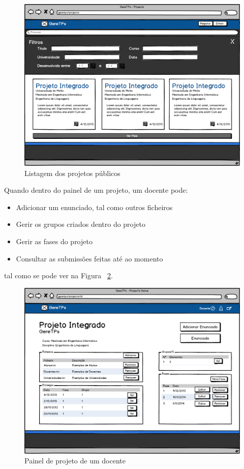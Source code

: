 \begin{figure}[htbp] 
        \centering
        \includegraphics[width=1\textwidth]{images/prototipos/mockups/Projetos.png}
         \caption{Listagem dos projetos públicos}
         \label{fig: projetospublicos}
\end{figure}


Quando dentro do painel de um projeto, um docente pode:

\begin{itemize}
	\item Adicionar um enunciado, tal como outros ficheiros
	\item Gerir os grupos criados dentro do projeto
	\item Gerir as fases do projeto
	\item Consultar as submissões feitas até ao momento
\end{itemize}
tal como se pode ver na Figura ~\ref{fig: painelprojetodocente}.\\

\begin{figure}[htbp] 
        \centering
        \includegraphics[width=1\textwidth]{images/prototipos/mockups/painelprojetodocente.png}
         \caption{Painel de projeto de um docente}
         \label{fig: painelprojetodocente}
\end{figure}

